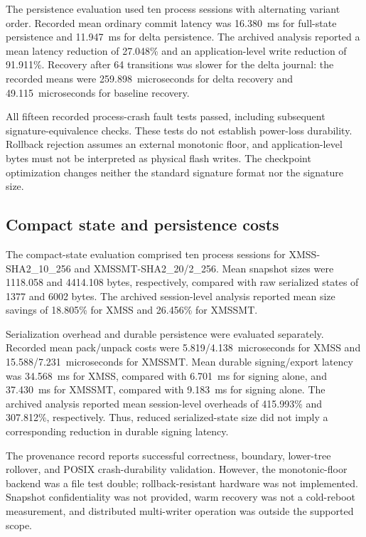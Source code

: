 \documentclass[pdflatex,sn-mathphys-num]{sn-jnl}
\begin{document}
The persistence evaluation used ten process sessions with alternating
variant order. Recorded mean ordinary commit latency was
16.380~ms for full-state persistence and 11.947~ms for delta persistence.
The archived analysis reported a mean latency reduction of 27.048\%
and an application-level write reduction of 91.911\%.
Recovery after 64 transitions was slower for the delta journal:
the recorded means were 259.898~microseconds for delta recovery and
49.115~microseconds for baseline recovery.

All fifteen recorded process-crash fault tests passed, including
subsequent signature-equivalence checks. These tests do not establish
power-loss durability. Rollback rejection assumes an external monotonic
floor, and application-level bytes must not be interpreted as physical
flash writes. The checkpoint optimization changes neither the standard
signature format nor the signature size.

\subsection{Compact state and persistence costs}
\label{subsec:compact_state_review}

The compact-state evaluation comprised ten process sessions for
XMSS-SHA2\_10\_256 and XMSSMT-SHA2\_20/2\_256. Mean snapshot sizes were
1118.058 and 4414.108 bytes, respectively, compared with raw serialized
states of 1377 and 6002 bytes. The archived session-level analysis
reported mean size savings of 18.805\% for XMSS and 26.456\% for XMSSMT.

Serialization overhead and durable persistence were evaluated
separately. Recorded mean pack/unpack costs were
5.819/4.138~microseconds for XMSS and
15.588/7.231~microseconds for XMSSMT.
Mean durable signing/export latency was 34.568~ms for XMSS,
compared with 6.701~ms for signing alone, and
37.430~ms for XMSSMT, compared with 9.183~ms for signing alone.
The archived analysis reported mean session-level overheads of
415.993\% and 307.812\%, respectively. Thus, reduced serialized-state
size did not imply a corresponding reduction in durable signing latency.

The provenance record reports successful correctness, boundary,
lower-tree rollover, and POSIX crash-durability validation.
However, the monotonic-floor backend was a file test double;
rollback-resistant hardware was not implemented. Snapshot confidentiality
was not provided, warm recovery was not a cold-reboot measurement,
and distributed multi-writer operation was outside the supported scope.
\end{document}
